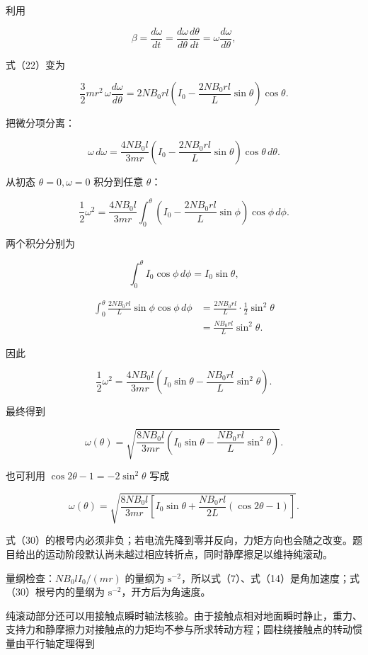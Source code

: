 \documentclass[12pt,a4paper,UTF8]{ctexart}
\begin{document}
利用

\[
\beta=\frac{d\omega}{dt}
=\frac{d\omega}{d\theta}\frac{d\theta}{dt}
=\omega\frac{d\omega}{d\theta}, \tag{23}
\]

式（22）变为

\[
\frac32mr^2\,\omega\frac{d\omega}{d\theta}
=2NB_0rl\left(I_0-\frac{2NB_0rl}{L}\sin\theta\right)\cos\theta. \tag{24}
\]

把微分项分离：

\[
\omega\,d\omega
=\frac{4NB_0l}{3mr}
\left(I_0-\frac{2NB_0rl}{L}\sin\theta\right)
\cos\theta\,d\theta. \tag{25}
\]

从初态 \(\theta=0,\omega=0\) 积分到任意 \(\theta\)：

\[
\frac12\omega^2
=\frac{4NB_0l}{3mr}
\int_0^\theta
\left(I_0-\frac{2NB_0rl}{L}\sin\phi\right)
\cos\phi\,d\phi. \tag{26}
\]

两个积分分别为

\[
\int_0^\theta I_0\cos\phi\,d\phi
=I_0\sin\theta, \tag{27}
\]

\[
\begin{aligned}
\int_0^\theta
\frac{2NB_0rl}{L}\sin\phi\cos\phi\,d\phi
&=\frac{2NB_0rl}{L}\cdot\frac12\sin^2\theta\\
&=\frac{NB_0rl}{L}\sin^2\theta.
\end{aligned} \tag{28}
\]

因此

\[
\frac12\omega^2
=\frac{4NB_0l}{3mr}
\left(
I_0\sin\theta-\frac{NB_0rl}{L}\sin^2\theta
\right). \tag{29}
\]

最终得到

\[
\boxed{
\omega(\theta)
=\sqrt{
\frac{8NB_0l}{3mr}
\left(
I_0\sin\theta-\frac{NB_0rl}{L}\sin^2\theta
\right)
}
}. \tag{30}
\]

也可利用 \(\cos2\theta-1=-2\sin^2\theta\) 写成

\[
\omega(\theta)
=\sqrt{
\frac{8NB_0l}{3mr}
\left[
I_0\sin\theta
+\frac{NB_0rl}{2L}(\cos2\theta-1)
\right]
}. \tag{31}
\]

式（30）的根号内必须非负；若电流先降到零并反向，力矩方向也会随之改变。题目给出的运动阶段默认尚未越过相应转折点，同时静摩擦足以维持纯滚动。

量纲检查：\(NB_0lI_0/(mr)\) 的量纲为
\(\mathrm s^{-2}\)，所以式（7）、式（14）是角加速度；式（30）根号内的量纲为
\(\mathrm s^{-2}\)，开方后为角速度。

纯滚动部分还可以用接触点瞬时轴法核验。由于接触点相对地面瞬时静止，重力、支持力和静摩擦力对接触点的力矩均不参与所求转动方程；圆柱绕接触点的转动惯量由平行轴定理得到
\end{document}
